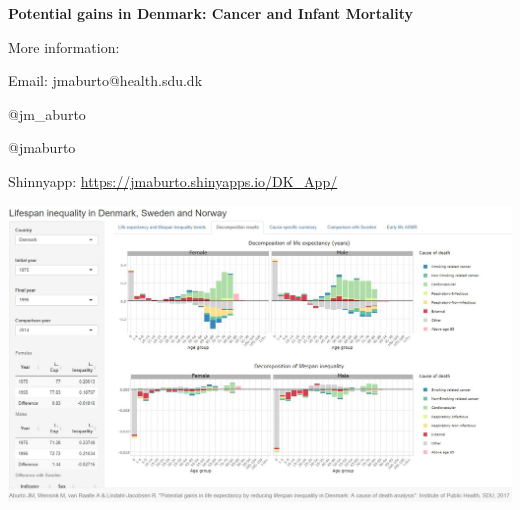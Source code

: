 \documentclass[xcolor={dvipsnames}]{beamer}
\begin{document}

\begin{frame}
 \begin{center}
	\begin{center}
	 \textbf{Potential gains in Denmark: Cancer and Infant Mortality}
	\end{center}
	
	\bigskip
	\bigskip
More information: 

Email: jmaburto@health.sdu.dk 

\faTwitter \quad  @jm\_aburto 

\faGithub \quad @jmaburto 

Shinnyapp: \url{https://jmaburto.shinyapps.io/DK_App/}


\includegraphics[scale=0.25]{Figures/ShinyappDK} \\   

\end{center}

\end{frame}
\end{document}
